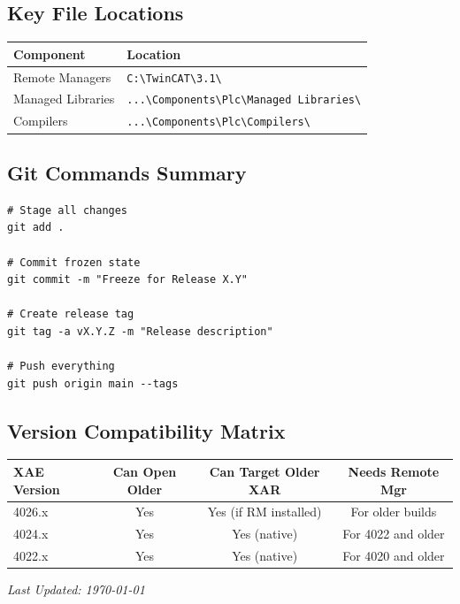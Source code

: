 \documentclass[11pt,a4paper]{article}
\begin{document}
\subsection*{Key File Locations}

\begin{table}[h]
\centering
\begin{tabular}{@{}ll@{}}
\toprule
\textbf{Component} & \textbf{Location} \\
\midrule
Remote Managers & \texttt{C:\textbackslash TwinCAT\textbackslash 3.1\textbackslash} \\
Managed Libraries & \texttt{...\textbackslash Components\textbackslash Plc\textbackslash Managed Libraries\textbackslash} \\
Compilers & \texttt{...\textbackslash Components\textbackslash Plc\textbackslash Compilers\textbackslash} \\
\bottomrule
\end{tabular}
\end{table}

\subsection*{Git Commands Summary}

\begin{lstlisting}[style=bashstyle]
# Stage all changes
git add .

# Commit frozen state
git commit -m "Freeze for Release X.Y"

# Create release tag
git tag -a vX.Y.Z -m "Release description"

# Push everything
git push origin main --tags
\end{lstlisting}

\subsection*{Version Compatibility Matrix}

\begin{table}[h]
\centering
\begin{tabular}{@{}lccc@{}}
\toprule
\textbf{XAE Version} & \textbf{Can Open Older} & \textbf{Can Target Older XAR} & \textbf{Needs Remote Mgr} \\
\midrule
4026.x & Yes & Yes (if RM installed) & For older builds \\
4024.x & Yes & Yes (native) & For 4022 and older \\
4022.x & Yes & Yes (native) & For 4020 and older \\
\bottomrule
\end{tabular}
\end{table}

\vfill

\begin{center}
\textit{Last Updated: \today}
\end{center}
\end{document}
